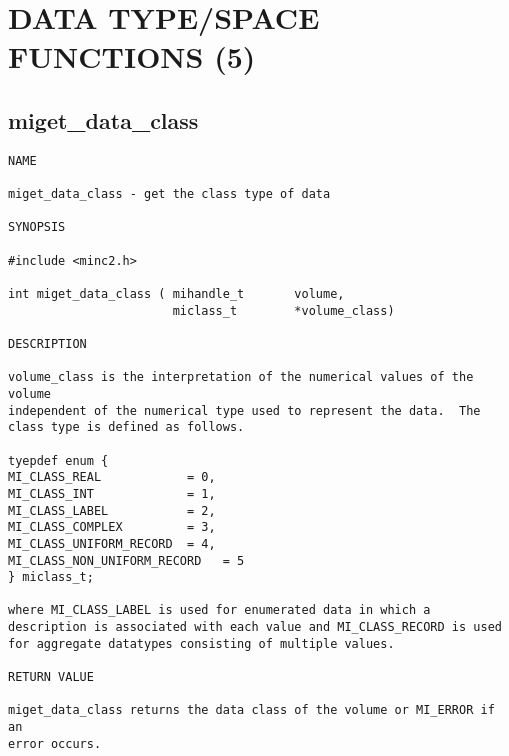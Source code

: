 \documentclass{article}
\begin{document}
\section{DATA TYPE/SPACE FUNCTIONS (5)}
\subsection{miget\_data\_class}

\begin{verbatim}
NAME

miget_data_class - get the class type of data

SYNOPSIS

#include <minc2.h>

int miget_data_class ( mihandle_t       volume,
                       miclass_t        *volume_class) 

DESCRIPTION

volume_class is the interpretation of the numerical values of the volume
independent of the numerical type used to represent the data.  The
class type is defined as follows.

tyepdef enum {
MI_CLASS_REAL            = 0,
MI_CLASS_INT             = 1,
MI_CLASS_LABEL           = 2,
MI_CLASS_COMPLEX         = 3,
MI_CLASS_UNIFORM_RECORD  = 4,
MI_CLASS_NON_UNIFORM_RECORD   = 5
} miclass_t;

where MI_CLASS_LABEL is used for enumerated data in which a
description is associated with each value and MI_CLASS_RECORD is used
for aggregate datatypes consisting of multiple values.
 
RETURN VALUE

miget_data_class returns the data class of the volume or MI_ERROR if an 
error occurs.
\end{verbatim}
\end{document}
